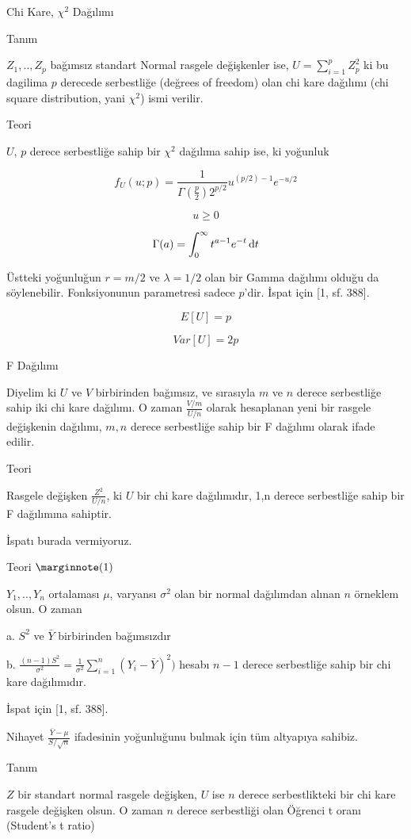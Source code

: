 \documentclass[12pt,fleqn]{article}\usepackage{../../common}
\begin{document}
Chi Kare, $\chi^2$ Dağılımı

Tanım

$Z_1, .. , Z_p$ bağımsız standart Normal rasgele değişkenler ise, $U = \sum _{
  i=1}^{p} Z_p^2$ ki bu dagilima $p$ derecede serbestliğe (değrees of freedom)
olan chi kare dağılımı (chi square distribution, yani $\chi^2$) ismi verilir.

Teori

$U$, $p$ derece serbestliğe sahip bir $\chi^2$ dağılıma sahip ise, ki yoğunluk 

$$
f_U(u;p) = \frac{ 1}{\Gamma(\frac{p}{2}) 2^{p/2}} u^{(p/2) - 1} e^{-u/2} 
$$

$$ u \ge 0 $$

$$ \Gamma(a) = \int _{0}^{\infty} t ^{a-1} e^{-t} \,\mathrm{d} t $$

Üstteki yoğunluğun $r=m/2$ ve $\lambda=1/2$ olan bir Gamma dağılımı olduğu
da söylenebilir. Fonksiyonunun parametresi sadece $p$'dir. İspat için [1,
sf. 388].

$$ E[U] = p $$

$$ Var[U] = 2p $$

F Dağılımı

Diyelim ki $U$ ve $V$ birbirinden bağımsız, ve sırasıyla $m$ ve $n$ derece
serbestliğe sahip iki chi kare dağılımı. O zaman $\frac{V/m}{U/n}$ olarak
hesaplanan yeni bir rasgele değişkenin dağılımı, $m,n$ derece serbestliğe
sahip bir F dağılımı olarak ifade edilir.

Teori

Rasgele değişken $\frac{Z^2}{U/n}$, ki $U$ bir chi kare dağılımıdır, 1,n
derece serbestliğe sahip bir F dağılımına sahiptir. 

İspatı burada vermiyoruz.

Teori $\mlabel{1}$

$Y_1,..,Y_n$ ortalaması $\mu$, varyansı $\sigma^2$ olan bir normal dağılımdan
alınan $n$ örneklem olsun. O zaman

a. $S^2$ ve $\bar{Y}$ birbirinden bağımsızdır

b. $\frac{(n-1)S^2}{\sigma^2}=\frac{1}{\sigma^2}\sum_{i=1}^{n}(Y_i-\bar{Y})^2)$
hesabı $n-1$ derece serbestliğe sahip bir chi kare dağılımıdır.

İspat için [1, sf. 388].

Nihayet $\frac{\bar{Y}-\mu}{S / \sqrt{n}}$ ifadesinin yoğunluğunu bulmak için
tüm altyapıya sahibiz.

Tanım

$Z$ bir standart normal rasgele değişken, $U$ ise $n$ derece serbestlikteki
bir chi kare rasgele değişken olsun. O zaman $n$ derece serbestliği olan
Öğrenci t oranı (Student's t ratio)
\end{document}
